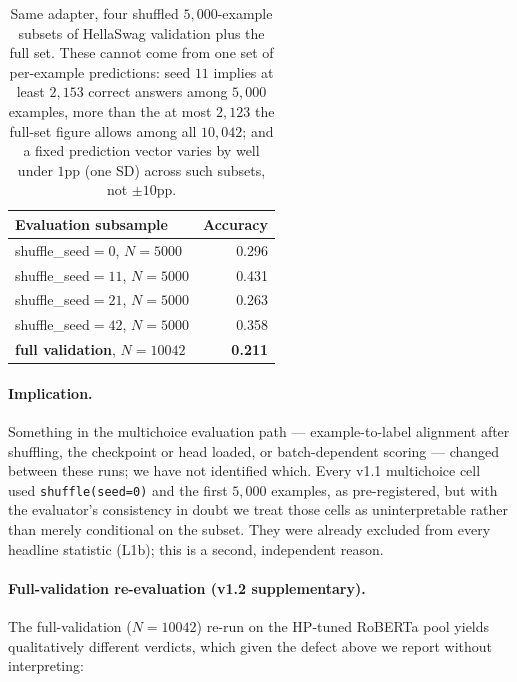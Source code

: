 \documentclass[11pt]{article}
\begin{document}
\begin{table}[h]
\centering
\caption{Same adapter, four shuffled $5{,}000$-example subsets of HellaSwag validation plus the full set. These cannot come from one set of per-example predictions: seed $11$ implies at least $2{,}153$ correct answers among $5{,}000$ examples, more than the at most $2{,}123$ the full-set figure allows among all $10{,}042$; and a fixed prediction vector varies by well under $1$pp (one SD) across such subsets, not $\pm10$pp.}
\label{tab:splitvar}
\small
\setlength{\tabcolsep}{5pt}
\begin{tabular}{@{}lr@{}}
\toprule
Evaluation subsample & Accuracy \\
\midrule
shuffle\_seed$=0$, $N{=}5000$ & 0.296 \\
shuffle\_seed$=11$, $N{=}5000$ & 0.431 \\
shuffle\_seed$=21$, $N{=}5000$ & 0.263 \\
shuffle\_seed$=42$, $N{=}5000$ & 0.358 \\
\midrule
\textbf{full validation}, $N{=}10042$ & \textbf{0.211} \\
\bottomrule
\end{tabular}
\end{table}

\paragraph{Implication.} Something in the multichoice evaluation path --- example-to-label alignment after shuffling, the checkpoint or head loaded, or batch-dependent scoring --- changed between these runs; we have not identified which. Every v1.1 multichoice cell used \texttt{shuffle(seed=0)} and the first $5{,}000$ examples, as pre-registered, but with the evaluator's consistency in doubt we treat those cells as uninterpretable rather than merely conditional on the subset. They were already excluded from every headline statistic (L1b); this is a second, independent reason.

\paragraph{Full-validation re-evaluation (v1.2 supplementary).} The full-validation ($N{=}10042$) re-run on the HP-tuned RoBERTa pool yields qualitatively different verdicts, which given the defect above we report without interpreting:
\end{document}
